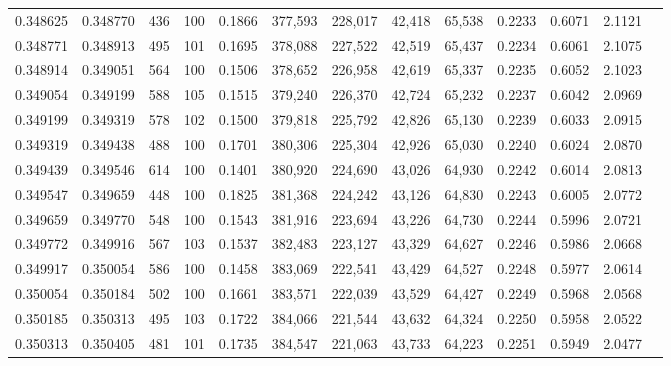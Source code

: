\begin{tabular}{rrrrrrrrrrrrr}
0.348625 & 0.348770 &   436 & 100 &                                     0.1866 & 377,593 & 228,017 &  42,418 &  65,538 & 0.2233 & 0.6071 & 2.1121 \\
0.348771 & 0.348913 &   495 & 101 &                                     0.1695 & 378,088 & 227,522 &  42,519 &  65,437 & 0.2234 & 0.6061 & 2.1075 \\
0.348914 & 0.349051 &   564 & 100 &                                     0.1506 & 378,652 & 226,958 &  42,619 &  65,337 & 0.2235 & 0.6052 & 2.1023 \\
0.349054 & 0.349199 &   588 & 105 &                                     0.1515 & 379,240 & 226,370 &  42,724 &  65,232 & 0.2237 & 0.6042 & 2.0969 \\
0.349199 & 0.349319 &   578 & 102 &                                     0.1500 & 379,818 & 225,792 &  42,826 &  65,130 & 0.2239 & 0.6033 & 2.0915 \\
0.349319 & 0.349438 &   488 & 100 &                                     0.1701 & 380,306 & 225,304 &  42,926 &  65,030 & 0.2240 & 0.6024 & 2.0870 \\
0.349439 & 0.349546 &   614 & 100 &                                     0.1401 & 380,920 & 224,690 &  43,026 &  64,930 & 0.2242 & 0.6014 & 2.0813 \\
0.349547 & 0.349659 &   448 & 100 &                                     0.1825 & 381,368 & 224,242 &  43,126 &  64,830 & 0.2243 & 0.6005 & 2.0772 \\
0.349659 & 0.349770 &   548 & 100 &                                     0.1543 & 381,916 & 223,694 &  43,226 &  64,730 & 0.2244 & 0.5996 & 2.0721 \\
0.349772 & 0.349916 &   567 & 103 &                                     0.1537 & 382,483 & 223,127 &  43,329 &  64,627 & 0.2246 & 0.5986 & 2.0668 \\
0.349917 & 0.350054 &   586 & 100 &                                     0.1458 & 383,069 & 222,541 &  43,429 &  64,527 & 0.2248 & 0.5977 & 2.0614 \\
0.350054 & 0.350184 &   502 & 100 &                                     0.1661 & 383,571 & 222,039 &  43,529 &  64,427 & 0.2249 & 0.5968 & 2.0568 \\
0.350185 & 0.350313 &   495 & 103 &                                     0.1722 & 384,066 & 221,544 &  43,632 &  64,324 & 0.2250 & 0.5958 & 2.0522 \\
0.350313 & 0.350405 &   481 & 101 &                                     0.1735 & 384,547 & 221,063 &  43,733 &  64,223 & 0.2251 & 0.5949 & 2.0477 \\

\end{tabular}
